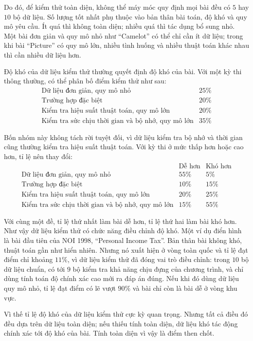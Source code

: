 \documentclass[11pt]{article}
\begin{document}
Do đó, để kiểm thử toàn diện, không thể máy móc quy định mọi bài đều có $5$
hay $10$ bộ dữ liệu. Số lượng tốt nhất phụ thuộc vào bản thân bài toán, độ khó
và quy mô yêu cầu. Ít quá thì không toàn diện; nhiều quá thì tác dụng bổ sung
nhỏ. Một bài đơn giản và quy mô nhỏ như ``Camelot'' có thể chỉ cần ít dữ liệu;
trong khi bài ``Picture'' có quy mô lớn, nhiều tình huống và nhiều thuật toán
khác nhau thì cần nhiều dữ liệu hơn.

Độ khó của dữ liệu kiểm thử thường quyết định độ khó của bài. Với một kỳ thi
thông thường, có thể phân bố điểm kiểm thử như sau:
\[
\begin{array}{l|r}
\text{Dữ liệu đơn giản, quy mô nhỏ} & 25\%\\
\text{Trường hợp đặc biệt} & 20\%\\
\text{Kiểm tra hiệu suất thuật toán, quy mô lớn} & 20\%\\
\text{Kiểm tra sức chịu thời gian và bộ nhớ, quy mô lớn} & 35\%
\end{array}
\]

Bốn nhóm này không tách rời tuyệt đối, vì dữ liệu kiểm tra bộ nhớ và thời gian
cũng thường kiểm tra hiệu suất thuật toán. Với kỳ thi ở mức thấp hơn hoặc cao
hơn, tỉ lệ nên thay đổi:
\[
\begin{array}{l|rr}
 & \text{Dễ hơn} & \text{Khó hơn}\\
\hline
\text{Dữ liệu đơn giản, quy mô nhỏ} & 55\% & 5\%\\
\text{Trường hợp đặc biệt} & 10\% & 15\%\\
\text{Kiểm tra hiệu suất thuật toán, quy mô lớn} & 20\% & 25\%\\
\text{Kiểm tra sức chịu thời gian và bộ nhớ, quy mô lớn} & 15\% & 55\%
\end{array}
\]

Với cùng một đề, tỉ lệ thứ nhất làm bài dễ hơn, tỉ lệ thứ hai làm bài khó hơn.
Như vậy dữ liệu kiểm thử có chức năng điều chỉnh độ khó. Một ví dụ điển hình
là bài đầu tiên của NOI 1998, ``Personal Income Tax''. Bản thân bài không khó,
thuật toán gần như hiển nhiên. Nhưng nó xuất hiện ở vòng toàn quốc và tỉ lệ
đạt điểm chỉ khoảng $11\%$, vì dữ liệu kiểm thử đã đóng vai trò điều chỉnh:
trong $10$ bộ dữ liệu chuẩn, có tới $9$ bộ kiểm tra khả năng chịu đựng của
chương trình, và chỉ dùng tính toán độ chính xác cao mới ra đáp án đúng. Nếu
khi đó dùng dữ liệu quy mô nhỏ, tỉ lệ đạt điểm có lẽ vượt $90\%$ và bài chỉ
còn là bài dễ ở vòng khu vực.

Vì thế tỉ lệ độ khó của dữ liệu kiểm thử cực kỳ quan trọng. Nhưng tất cả điều
đó đều dựa trên dữ liệu toàn diện; nếu thiếu tính toàn diện, dữ liệu khó tác
động chính xác tới độ khó của bài. Tính toàn diện vì vậy là điểm then chốt.
\end{document}
